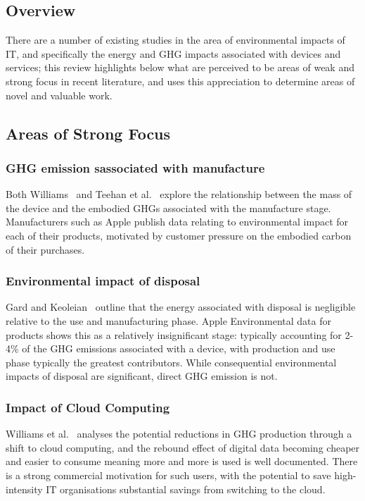 \documentclass[conference]{IEEEtran}
\begin{document}
\subsection{Overview}

There are a number of existing studies in the area of environmental
impacts of IT, and specifically the energy and GHG impacts associated
with devices and services; this review highlights below what are
perceived to be areas of weak and strong focus in recent literature,
and uses this appreciation to determine areas of novel and valuable
work.

\subsection{Areas of Strong Focus}

\subsubsection{GHG emission sassociated with manufacture}

Both Williams~\cite{williams:2004} and Teehan et
al.~\cite{teehan-et-al:2010} explore the relationship between the mass
of the device and the embodied GHGs associated with the manufacture
stage. Manufacturers such as Apple publish data relating to
environmental impact for each of their products, motivated by customer
pressure on the embodied carbon of their purchases.

\subsubsection{Environmental impact of disposal}

Gard and Keoleian~\cite{gard+keoleian:2002} outline that the energy
associated with disposal is negligible relative to the use and
manufacturing phase. Apple Environmental data for products shows this
as a relatively insignificant stage: typically accounting for 2-4\% of
the GHG emissions associated with a device, with production and use
phase typically the greatest contributors. While consequential
environmental impacts of disposal are significant, direct GHG emission
is not.

\subsubsection{Impact of Cloud Computing}

Williams et al.~\cite{williams-et-al:2014} analyses the potential
reductions in GHG production through a shift to cloud computing, and
the rebound effect of digital data becoming cheaper and easier to
consume meaning more and more is used is well documented. There is a
strong commercial motivation for such users, with the potential to
save high-intensity IT organisations substantial savings from
switching to the cloud.
\end{document}
